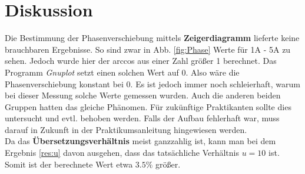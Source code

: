 \documentclass[12pt,a4paper,titlepage,headinclude,bibtotoc]{scrartcl}
\begin{document}
\section{Diskussion}
\label{sec:diskussion}
Die Bestimmung der Phasenverschiebung mittels \textbf{Zeigerdiagramm} lieferte keine brauchbaren Ergebnisse.
So sind zwar in Abb. \ref{fig:Phase} Werte für 1A - 5A zu sehen.
Jedoch wurde hier der arccos aus einer Zahl größer 1 berechnet.
Das Programm \textit{Gnuplot} setzt einen solchen Wert auf 0. 
Also wäre die Phasenverschiebung konstant bei 0.
Es ist jedoch immer noch schleierhaft, warum bei dieser Messung solche Werte gemessen wurden.
Auch die anderen beiden Gruppen hatten das gleiche Phänomen.
Für zukünftige Praktikanten sollte dies untersucht und evtl. behoben werden.
Falls der Aufbau fehlerhaft war, muss darauf in Zukunft in der Praktikumsanleitung hingewiesen werden.\\

Da das \textbf{Übersetzungsverhältnis} meist ganzzahlig ist, kann man bei dem Ergebnis \eqref{res:u} davon ausgehen, dass das tatsächliche Verhältnis $u=10$ ist.
Somit ist der berechnete Wert etwa $3.5\%$ größer.




\end{document}
